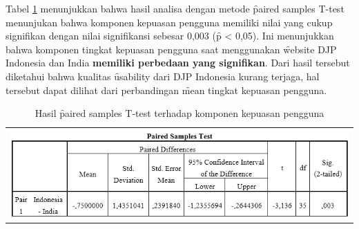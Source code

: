 \noindent
Tabel \ref{tab:ttestsat} menunjukkan bahwa hasil analisa dengan metode \f{paired samples T-test} menunjukan bahwa komponen kepuasan pengguna memiliki nilai yang cukup signifikan dengan nilai signifikansi sebesar 0,003 (\f{p} < 0,05). Ini menunjukkan bahwa komponen tingkat kepuasan pengguna saat menggunakan \f{website} DJP Indonesia dan India \textbf{memiliki perbedaan yang signifikan}. Dari hasil tersebut diketahui bahwa kualitas \f{usability} dari DJP Indonesia kurang terjaga, hal tersebut dapat dilihat dari perbandingan \f{mean} tingkat kepuasan pengguna.
\begin{table}
	\centering
	\caption{Hasil \f{paired samples T-test} terhadap komponen kepuasan pengguna}
	\label{tab:ttestsat}
	\begin{tabular}{c}
		\includegraphics[width=\textwidth]
		{pics/ordinalT-testSAT.PNG}
	\end{tabular}
\end{table}
\noindent
